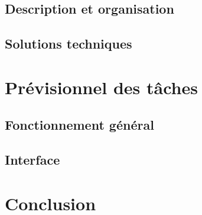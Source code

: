 \documentclass[11pt]{report}
\begin{document}
		\section{Description et organisation}

		\section{Solutions techniques}

	\chapter{Prévisionnel des tâches}

		\section{Fonctionnement général}

		\section{Interface}

	\chapter{Conclusion}
\end{document}
